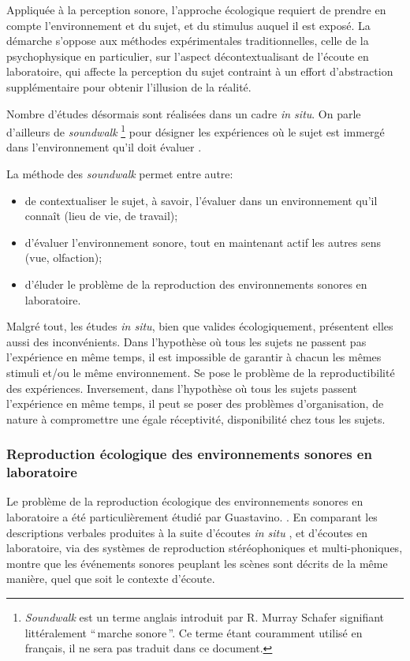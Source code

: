 {Appliquée à la perception sonore, l'approche écologique requiert de prendre en compte l'environnement et du sujet, et du stimulus auquel il est exposé. La démarche s'oppose aux méthodes expérimentales traditionnelles, celle de la psychophysique en particulier, sur l'aspect décontextualisant de l'écoute en laboratoire, qui affecte la perception du sujet contraint à un effort d'abstraction supplémentaire pour obtenir l'illusion de la réalité.

Nombre d'études désormais sont réalisées dans un cadre \emph{in situ}. On parle d'ailleurs de \emph{soundwalk}  \footnote{\emph{Soundwalk} est un terme anglais introduit par R. Murray Schafer \citep{schafer1969new} signifiant littéralement ``\,marche sonore\,''. Ce terme étant couramment utilisé en français, il ne sera pas traduit dans ce document.} pour désigner les expériences où le sujet est immergé dans l'environnement qu'il doit évaluer \citep{adams2008soundwalking,jeon2013soundwalk}.

La méthode des \emph{soundwalk} permet entre autre:

\begin{itemize}
\item  de contextualiser le sujet, à savoir, l'évaluer dans un environnement qu'il connaît (lieu de vie, de travail);
\item d'évaluer l'environnement sonore, tout en maintenant actif les autres sens (vue, olfaction);
\item d'éluder le problème de la reproduction des environnements sonores en laboratoire.
\end{itemize}

Malgré tout, les études \emph{in situ}, bien que valides écologiquement, présentent elles aussi des inconvénients. Dans l'hypothèse où tous les sujets ne passent pas l'expérience en même temps, il est impossible de garantir à chacun les mêmes stimuli et/ou le même environnement. Se pose le problème de la reproductibilité des expériences. Inversement, dans l'hypothèse où tous les sujets passent l'expérience en même temps, il peut se poser des problèmes d'organisation, de nature à compromettre une égale réceptivité, disponibilité chez tous les sujets.

\subsubsection{Reproduction écologique des environnements sonores en laboratoire}

Le problème de la reproduction écologique des environnements sonores en laboratoire a été particulièrement étudié par Guastavino. \citep{guastavino2003approche,guastavino2004perceptual,guastavino2005ecological}. En comparant les descriptions verbales produites à la suite d'écoutes \emph{in situ} , et d'écoutes en laboratoire, via des systèmes de reproduction stéréophoniques et multi-phoniques, \citep{guastavino2005ecological} montre que les événements sonores peuplant les scènes sont décrits de la même manière, quel que soit le contexte d'écoute.

}
